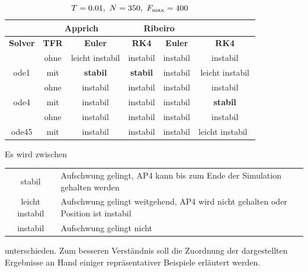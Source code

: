 \begin{table}[htbp]
	\centering
	\caption{$T=0.01, \ N=350, \ F_{\mrm{max}}=400$}
		\begin{tabular}{c|c|c|c|c|c}
			\rowcolor[gray]{0.9}
			\multicolumn{2}{c|}{\textbf{Simulation}} & \multicolumn{2}{c|}{\textbf{Apprich}} & \multicolumn{2}{c}{\textbf{Ribeiro}} \\
			\midrule
			\rowcolor[gray]{0.9}
			\textbf{Solver} & \textbf{TFR} & \textbf{Euler} & \textbf{RK4} & \textbf{Euler} & \textbf{RK4} \\
			\midrule
			\cellcolor[gray]{0.9}  											& \cellcolor[gray]{.9}ohne & leicht instabil & instabil       & instabil & instabil\\
			\multirow{-2}{*}{\cellcolor[gray]{.9}ode1}	& \cellcolor[gray]{.9}mit  & \textbf{stabil} & \textbf{stabil} & instabil & leicht instabil\\
			\midrule
			\cellcolor[gray]{0.9}  											& \cellcolor[gray]{.9}ohne    & instabil	&  instabil & instabil & instabil\\
			\multirow{-2}{*}{\cellcolor[gray]{.9}ode4}	& \cellcolor[gray]{.9}mit     & instabil  & instabil  & instabil & \textbf{stabil}\\
			\midrule	
			\cellcolor[gray]{0.9}  											& \cellcolor[gray]{.9}ohne    & instabil &  instabil    & instabil 	& instabil\\
			\multirow{-2}{*}{\cellcolor[gray]{.9}ode45}	& \cellcolor[gray]{.9}mit     & instabil &  instabil    & instabil 	& leicht instabil\																											
		\end{tabular}
	\label{tab:T001N350Fmax400}
\end{table}

Es wird zwischen 

\begin{center}
	\begin{tabular}{cl}
		stabil & Aufschwung gelingt, AP4 kann bis zum Ende der Simulation gehalten werden \\
		leicht instabil & Aufschwung gelingt weitgehend, AP4 wird nicht gehalten oder Position ist instabil  \\
		instabil & Aufschwung gelingt nicht \\
	\end{tabular}
\end{center}

unterschieden. Zum besseren Verständnis soll die Zuordnung der dargestellten Ergebnisse an Hand einiger repräsentativer Beispiele erläutert werden.

